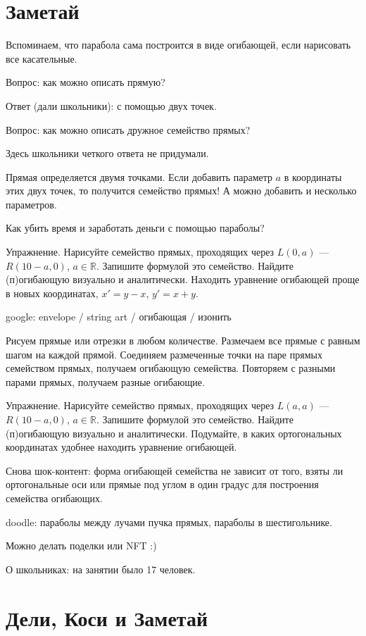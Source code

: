 \documentclass[12pt]{article}
\theoremstyle{definition}
\begin{document}
\section{Заметай}

Вспоминаем, что парабола сама построится в виде огибающей, если нарисовать все касательные. 

Вопрос: как можно описать прямую?

Ответ (дали школьники): с помощью двух точек.

Вопрос: как можно описать дружное семейство прямых?

Здесь школьники четкого ответа не придумали. 

Прямая определяется двумя точками. Если добавить параметр $a$ в координаты этих двух точек, то получится семейство прямых!
А можно добавить и несколько параметров. 

Как убить время и заработать деньги с помощью параболы?

Упражнение. Нарисуйте семейство прямых, проходящих через $L(0, a)$ — $R(10 - a, 0)$, $a\in \mathbb R$. 
Запишите формулой это семейство. Найдите (п)огибающую визуально и аналитически.
Находить уравнение огибающей проще в новых координатах, $x' = y - x$, $y'=x+y$.

google: envelope / string art / огибающая / изонить

Рисуем прямые или отрезки в любом количестве. Размечаем все прямые с равным шагом на каждой прямой. 
Соединяем размеченные точки на паре прямых семейством прямых, получаем огибающую семейства. Повторяем с разными парами прямых, получаем разные огибающие.

Упражнение. Нарисуйте семейство прямых, проходящих через $L(a, a)$ — $R(10 - a, 0)$, $a\in \mathbb R$.
Запишите формулой это семейство. Найдите (п)огибающую визуально и аналитически.
Подумайте, в каких ортогональных координатах удобнее находить уравнение огибающей. 

Снова шок-контент: форма огибающей семейства не зависит от того, 
взяты ли ортогональные оси или прямые под углом в один градус для построения семейства огибающих.

doodle: параболы между лучами пучка прямых, параболы в шестигольнике. 

Можно делать поделки или NFT :)

О школьниках: на занятии было 17 человек. 

\section{Дели, Коси и Заметай} 
\end{document}
